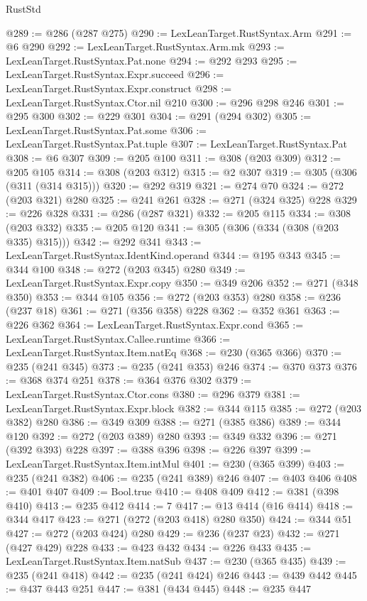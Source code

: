 \begin{lexlean}{RustStd}
\begin{coremodule}
@289 := @286 (@287 @275)
@290 := LexLeanTarget.RustSyntax.Arm
@291 := @6 @290
@292 := LexLeanTarget.RustSyntax.Arm.mk
@293 := LexLeanTarget.RustSyntax.Pat.none
@294 := @292 @293
@295 := LexLeanTarget.RustSyntax.Expr.succeed
@296 := LexLeanTarget.RustSyntax.Expr.construct
@298 := LexLeanTarget.RustSyntax.Ctor.nil @210
@300 := @296 @298 @246
@301 := @295 @300
@302 := @229 @301
@304 := @291 (@294 @302)
@305 := LexLeanTarget.RustSyntax.Pat.some
@306 := LexLeanTarget.RustSyntax.Pat.tuple
@307 := LexLeanTarget.RustSyntax.Pat
@308 := @6 @307
@309 := @205 @100
@311 := @308 (@203 @309)
@312 := @205 @105
@314 := @308 (@203 @312)
@315 := @2 @307
@319 := @305 (@306 (@311 (@314 @315)))
@320 := @292 @319
@321 := @274 @70
@324 := @272 (@203 @321) @280
@325 := @241 @261
@328 := @271 (@324 @325) @228
@329 := @226 @328
@331 := @286 (@287 @321)
@332 := @205 @115
@334 := @308 (@203 @332)
@335 := @205 @120
@341 := @305 (@306 (@334 (@308 (@203 @335) @315)))
@342 := @292 @341
@343 := LexLeanTarget.RustSyntax.IdentKind.operand
@344 := @195 @343
@345 := @344 @100
@348 := @272 (@203 @345) @280
@349 := LexLeanTarget.RustSyntax.Expr.copy
@350 := @349 @206
@352 := @271 (@348 @350)
@353 := @344 @105
@356 := @272 (@203 @353) @280
@358 := @236 (@237 @18)
@361 := @271 (@356 @358) @228
@362 := @352 @361
@363 := @226 @362
@364 := LexLeanTarget.RustSyntax.Expr.cond
@365 := LexLeanTarget.RustSyntax.Callee.runtime
@366 := LexLeanTarget.RustSyntax.Item.natEq
@368 := @230 (@365 @366)
@370 := @235 (@241 @345)
@373 := @235 (@241 @353) @246
@374 := @370 @373
@376 := @368 @374 @251
@378 := @364 @376 @302
@379 := LexLeanTarget.RustSyntax.Ctor.cons
@380 := @296 @379
@381 := LexLeanTarget.RustSyntax.Expr.block
@382 := @344 @115
@385 := @272 (@203 @382) @280
@386 := @349 @309
@388 := @271 (@385 @386)
@389 := @344 @120
@392 := @272 (@203 @389) @280
@393 := @349 @332
@396 := @271 (@392 @393) @228
@397 := @388 @396
@398 := @226 @397
@399 := LexLeanTarget.RustSyntax.Item.intMul
@401 := @230 (@365 @399)
@403 := @235 (@241 @382)
@406 := @235 (@241 @389) @246
@407 := @403 @406
@408 := @401 @407
@409 := Bool.true
@410 := @408 @409
@412 := @381 (@398 @410)
@413 := @235 @412
@414 := 7
@417 := @13 @414 (@16 @414)
@418 := @344 @417
@423 := @271 (@272 (@203 @418) @280 @350)
@424 := @344 @51
@427 := @272 (@203 @424) @280
@429 := @236 (@237 @23)
@432 := @271 (@427 @429) @228
@433 := @423 @432
@434 := @226 @433
@435 := LexLeanTarget.RustSyntax.Item.natSub
@437 := @230 (@365 @435)
@439 := @235 (@241 @418)
@442 := @235 (@241 @424) @246
@443 := @439 @442
@445 := @437 @443 @251
@447 := @381 (@434 @445)
@448 := @235 @447

\end{coremodule}
\end{lexlean}
